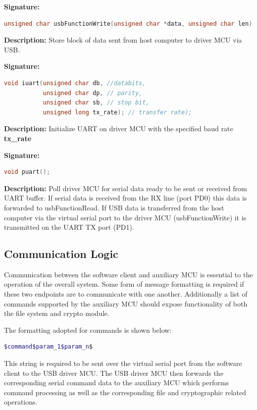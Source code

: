 \textbf{Signature: } 
\begin{lstlisting}[language=C]
unsigned char usbFunctionWrite(unsigned char *data, unsigned char len)
\end{lstlisting}
\textbf{Description: }  \linebreak
Store block of data sent from host computer to driver MCU via USB.

\textbf{Signature: } 
\begin{lstlisting}[language=C]
void iuart(unsigned char db, //databits,
           unsigned char dp, // parity,
           unsigned char sb, // stop bit,
           unsigned long tx_rate); // transfer rate);
\end{lstlisting}
\textbf{Description: }  \linebreak
Initialize UART on driver MCU with the specified baud rate \textbf{tx\_rate}

\textbf{Signature: } 
\begin{lstlisting}[language=C]
void puart();
\end{lstlisting}
\textbf{Description: }  \linebreak
Poll driver MCU for serial data ready to be sent or received from UART buffer. If serial data is received from the RX line (port PD0) this data is forwarded to usbFunctionRead. If USB data is transferred from the host computer via the virtual serial port to the driver MCU (usbFunctionWrite) it is transmitted on the UART TX port (PD1).

\subsection{Communication Logic}
Communication between the software client and auxiliary MCU is essential to the operation of the overall system. Some form of message formatting is required if these two endpoints are to communicate with one another. Additionally a list of commands supported by the auxiliary MCU should expose functionality of both the file system and crypto module.

The formatting adopted for commands is shown below:
\begin{lstlisting}[language=bash, frame=none]
$command$param_1$param_n$
\end{lstlisting}

This string is required to be sent over the virtual serial port from the software client to the USB driver MCU. The USB driver MCU then forwards the corresponding serial command data to the auxiliary MCU which performs command processing as well as the corresponding file and cryptographic related operations.

